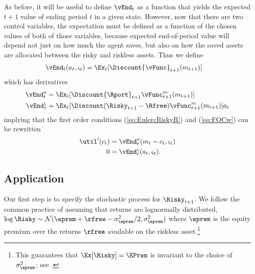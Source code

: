 \documentclass[titlepage]{\econtex}
\begin{document}
As before, it will be useful to define $\vEnd_{t}$ as a function that
yields the expected $t+1$ value of ending period $t$ in a given state.
However, now that there are two control variables, the expectation
must be defined as a function of the chosen values of both of those
variables, because expected end-of-period value will depend not just
on how much the agent saves, but also on how the saved assets are
allocated between the risky and riskless assets.  Thus we define
\begin{equation*}\begin{gathered}\begin{aligned}
  \vEnd_{t}({a}_{t},\varsigma_{t})  & = \Ex_{t}[\Discount {\vFunc}_{t+1}({m}_{t+1})]
\end{aligned}\end{gathered}\end{equation*}
which has derivatives
\begin{equation*}\begin{gathered}\begin{aligned}
  \vEnd_{t}^{{a}}  & = \Ex_{t}[\Discount {\Rport}_{t+1}{\vFunc}_{t+1}^{m}({m}_{t+1})]
  \\      \vEnd_{t}^{\varsigma}  & = \Ex_{t}[\Discount (\Risky_{t+1}-\Rfree){\vFunc}_{t+1}^{m}({m}_{t+1})  ]a_{t}
\end{aligned}\end{gathered}\end{equation*}
implying that the first order conditions (\ref{eq:EulercRiskyR}) and
(\ref{eq:FOCw}) can be rewritten
\begin{equation}\begin{gathered}\begin{aligned}
  \util^{\prime}({c}_{t})  & = \vEnd_{t}^{{a}}({m}_{t}-{c}_{t},\varsigma_{t})
  \\      0  & = \vEnd^{\varsigma}_{t}({a}_{t},\varsigma_{t}).
\end{aligned}\end{gathered}\end{equation}

\subsection{Application}

Our first step is to specify the stochastic process for $\Risky_{t+1}$.
We follow the common practice of assuming that returns are
lognormally distributed, $\log \Risky \sim
\mathcal{N}(\eprem+\rfree-\sigma^{2}_{\eprem}/2,\sigma^{2}_{\eprem})$ where $\eprem$ is the equity premium
over the returns $\rfree$ available on the riskless asset.\footnote{This guarantees that $\Ex[\Risky] = \EPrem$ is invariant to the choice of $\sigma^{2}_{\eprem}$; see .}
\end{document}
